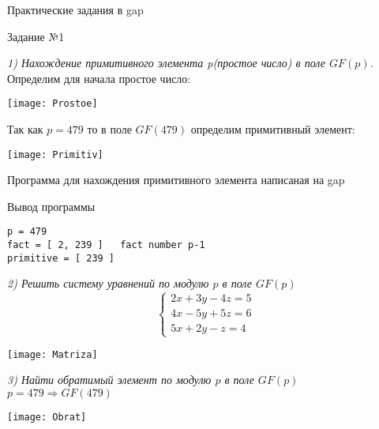 \begin{title}
  Практические задания в gap
\end{title}

\begin{title}
  Задание №1
\end{title}

\emph{1) Нахождение примитивного элемента p(простое число) в поле $GF(p)$.}\\
Определим для начала простое число:\\

\begin{center}
  \texttt{[image: Prostoe]}
\end{center}

Так как $p = 479$ то в поле $GF(479)$ определим примитивный элемент:\\

\begin{center}
  \texttt{[image: Primitiv]}
\end{center}

Программа для нахождения примитивного элемента написаная на gap


Вывод программы
\begin{lstlisting}
p = 479
fact = [ 2, 239 ]   fact number p-1
primitive = [ 239 ]
\end{lstlisting}

\emph {2) Решить систему уравнений по модулю $p$ в поле $GF(p)$}\\

\begin{equation*}
 \begin{cases}
    2x + 3y - 4z = 5\\
    4x - 5y + 5z = 6\\
    5x + 2y - z = 4
 \end{cases}
\end{equation*}

\begin{center}
  \texttt{[image: Matriza]}
\end{center}

\emph {3) Найти обратимый элемент по модулю $p$ в поле $GF(p)$}\\
$p = 479 \Rightarrow GF(479)$\\

\begin{center}
  \texttt{[image: Obrat]}
\end{center}

